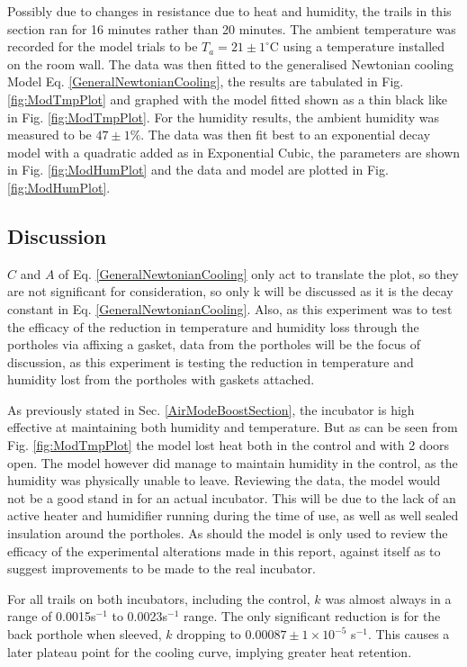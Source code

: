 \documentclass{article}
\begin{document}
Possibly due to changes in resistance due to heat and humidity, the trails in this section ran for 16 minutes rather than 20 minutes. The ambient temperature was recorded for the model trials to be $T_a = 21 \pm 1^{\circ}$C using a temperature installed on the room wall. The data was then fitted to the generalised Newtonian cooling Model Eq. \ref{GeneralNewtonianCooling}, the results are tabulated in Fig. \ref{fig:ModTmpPlot} and graphed with the model fitted shown as a thin black like in Fig. \ref{fig:ModTmpPlot}. 
For the humidity results, the ambient humidity was measured to be $47 \pm 1\%$. The data was then fit best to an exponential decay model with a quadratic added as in Exponential Cubic, the parameters are shown in Fig. \ref{fig:ModHumPlot} and the data and model are plotted in Fig. \ref{fig:ModHumPlot}.

\newpage
\subsection{Discussion}

$C$ and $A$ of  Eq. \ref{GeneralNewtonianCooling} only act to translate the plot, so they are not significant for consideration, so only k will be discussed as it is the decay constant in  Eq. \ref{GeneralNewtonianCooling}.  Also, as this experiment was to test the efficacy of the reduction in temperature and humidity loss through the portholes via affixing a gasket, data from the portholes will be the focus of discussion, as this experiment is testing the reduction in temperature and humidity lost from the portholes with gaskets attached.

\vspace{3mm}
As previously stated in Sec. \ref{AirModeBoostSection}, the incubator is high effective at maintaining both humidity and temperature. But as can be seen from Fig. \ref{fig:ModTmpPlot} the model lost heat both in the control and with 2 doors open. The model however did manage to maintain humidity in the control, as the humidity was physically unable to leave. Reviewing the data, the model would not be a good stand in for an actual incubator. This will be due to the lack of an active heater and humidifier running during the time of use, as well as well sealed insulation around the portholes. As should the model is only used to review the efficacy of the experimental alterations made in this report, against itself as to suggest improvements to be made to the real incubator.

\vspace{3mm}
For all trails on both incubators, including the control, $k$ was almost always in a range of 0.0015s$^{-1}$ to 0.0023s$^{-1}$ range. The only significant reduction is for the back porthole when sleeved, $k$ dropping to $0.00087 \pm 1\times10^{-5}$ s$^{-1}$. This causes a later plateau point for the cooling curve, implying greater heat retention.
\end{document}
